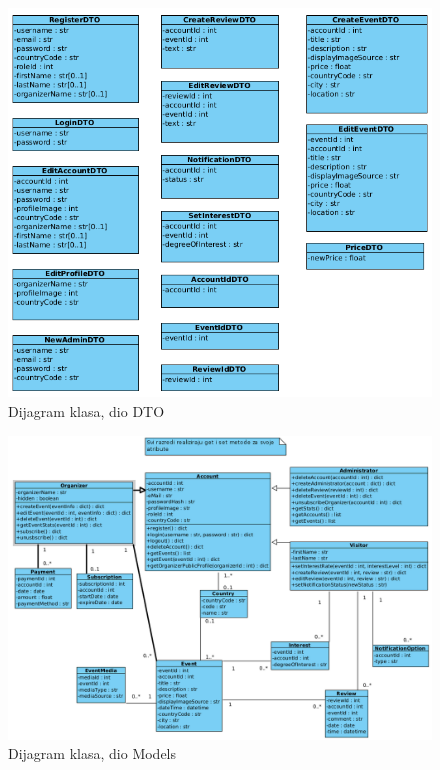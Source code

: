 			\begin{figure}[htbp]
				\centering
				\includegraphics[width=1\textwidth]{dijagrami/dijagram_mvc_dto.png}
				\caption{Dijagram klasa, dio DTO}
			\label{fig:my_image}
			\end{figure}

			\newpage

			\begin{figure}[htbp]
				\centering
				\includegraphics[width=1\textwidth]{dijagrami/dijagram_mvc_models.png}
				\caption{Dijagram klasa, dio Models}
			\label{fig:my_image}
			\end{figure}


